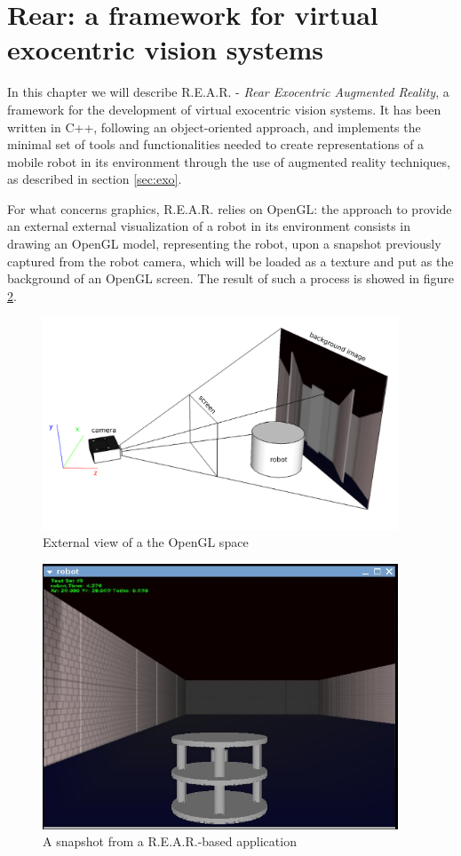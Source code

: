 \section{\textsf{Rear:} a framework for virtual exocentric vision systems}
\label{sec:rear}

In this chapter we will describe \textsf{R.E.A.R.} - 
\textit{Rear Exocentric Augmented Reality}, a framework 
for the development of virtual exocentric vision systems.
%
It has been written in C++, following an object-oriented 
approach, and implements the minimal set of tools and functionalities 
needed to create representations of a mobile robot in its environment 
through the use of augmented reality techniques, as described in 
section \ref{sec:exo}.
%

%
For what concerns graphics, \textsf{R.E.A.R.} relies on OpenGL: the approach 
to provide an external external visualization of a robot in its 
environment consists in drawing an OpenGL model, representing the robot,
upon a snapshot previously captured from the robot camera, which will be 
loaded as a texture and put as the background of an OpenGL screen. The result 
of such a process is showed in figure \ref{fig:snap}.
%
\begin{figure}[!h]
  \begin{center}
    \includegraphics[width=300pt]{img/camera_frustum_scheme.png}
    \caption{External view of a the OpenGL space}
    \label{fig:openglspace}
  \end{center}
\end{figure}
%
\begin{figure}[!h]
  \begin{center}
    \includegraphics[width=300pt]{img/rear_snapshot_large.jpg}
    \caption{A snapshot from a \textsf{R.E.A.R.}-based application}
    \label{fig:snap}
  \end{center}
\end{figure}
